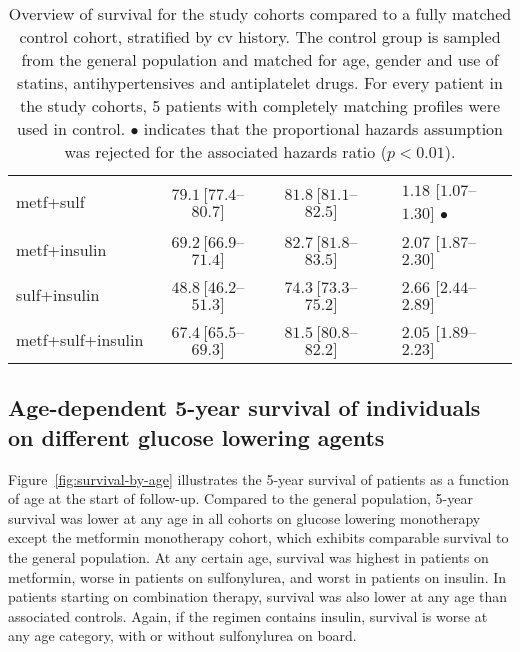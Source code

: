 \begin{table}[!p]
\begin{tabular}{lcccl}
metf+sulf				& $79.1\ [77.4$--$80.7]$ & $81.8\ [81.1$--$82.5]$ & & $1.18$ $[1.07$--$1.30]$ $\bullet$ \\ %
metf+insulin		        	& $69.2\ [66.9$--$71.4]$ & $82.7\ [81.8$--$83.5]$ & & $2.07$ $[1.87$--$2.30]$ \\ %
sulf+insulin			        & $48.8\ [46.2$--$51.3]$ & $74.3\ [73.3$--$75.2]$ & & $2.66$ $[2.44$--$2.89]$ \\ %
metf+sulf+insulin		        & $67.4\ [65.5$--$69.3]$ & $81.5\ [80.8$--$82.2]$ & & $2.05$ $[1.89$--$2.23]$ \\ %
\bottomrule
\end{tabular}
\caption{Overview of survival for the study cohorts compared to a fully matched control cohort, stratified by cv history. The control group is sampled from the general population and matched for age, gender and use of statins, antihypertensives and antiplatelet drugs. For every patient in the study cohorts, 5 patients with completely matching profiles were used in control. $\bullet$ indicates that the proportional hazards assumption was rejected for the associated hazards ratio ($p<0.01$).} \label{table:survival-results}
\end{table}

\subsection{Age-dependent 5-year survival of individuals on different glucose lowering agents}
Figure~\ref{fig:survival-by-age} illustrates the 5-year survival of patients as a function of age at the start of follow-up. Compared to the general population, 5-year survival was lower at any age in all cohorts on glucose lowering monotherapy except the metformin monotherapy cohort, which exhibits comparable survival to the general population. At any certain age, survival was highest in patients on metformin, worse in patients on sulfonylurea, and worst in patients on insulin. In patients starting on combination therapy, survival was also lower at any age than associated controls. Again, if the regimen contains insulin, survival is worse at any age category, with or without sulfonylurea on board. 



